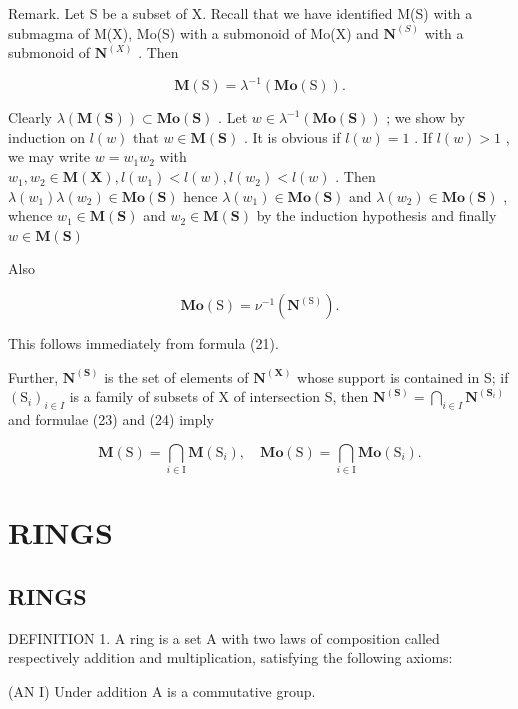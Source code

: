 Remark. Let S be a subset of X. Recall that we have identified M(S) with a submagma of M(X), Mo(S) with a submonoid of Mo(X) and \(\mathbf{N}^{(S)}\) with a submonoid of \(\mathbf{N}^{(X)}\) . Then

\[
\mathbf {M} (\mathrm{S}) = \lambda^ {- 1} (\mathbf {M o} (\mathrm{S})).\tag{23}
\]

Clearly \(\lambda (\mathbf{M}(\mathbf{S}))\subset \mathbf{Mo}(\mathbf{S})\) . Let \(w\in \lambda^{-1}(\mathbf{Mo}(\mathbf{S}))\) ; we show by induction on \(l(w)\) that \(w\in \mathbf{M}(\mathbf{S})\) . It is obvious if \(l(w) = 1\) . If \(l(w) > 1\) , we may write \(w = w_{1}w_{2}\) with \(w_{1},w_{2}\in \mathbf{M}(\mathbf{X}), l(w_{1}) <   l(w),l(w_{2}) <   l(w)\) . Then \(\lambda (w_1)\lambda (w_2)\in \mathbf{Mo}(\mathbf{S})\) hence \(\lambda (w_1)\in \mathbf{Mo}(\mathbf{S})\) and \(\lambda (w_2)\in \mathbf{Mo}(\mathbf{S})\) , whence \(w_{1}\in \mathbf{M}(\mathbf{S})\) and \(w_{2}\in \mathbf{M}(\mathbf{S})\) by the induction hypothesis and finally \(w\in \mathbf{M}(\mathbf{S})\)

Also

\[
\mathbf {M o} (\mathrm{S}) = \nu^ {- 1} (\mathbf {N} ^ {(\mathrm{S})}).\tag{24}
\]

This follows immediately from formula (21).

Further, \(\mathbf{N}^{(\mathbf{S})}\) is the set of elements of \(\mathbf{N}^{(\mathbf{X})}\) whose support is contained in S; if \((\mathrm{S}_i)_{i\in I}\) is a family of subsets of X of intersection S, then \(\mathbf{N}^{(\mathbf{S})} = \bigcap_{i\in I}\mathbf{N}^{(\mathbf{S}_i)}\) and formulae (23) and (24) imply

\[
\mathbf {M} (\mathrm{S}) = \bigcap_ {i \in \mathrm{I}} \mathbf {M} (\mathrm{S} _ {i}), \quad \mathbf {M o} (\mathrm{S}) = \bigcap_ {i \in \mathrm{I}} \mathbf {M o} (\mathrm{S} _ {i}).\tag{25}
\]

\section{RINGS}

\subsection{RINGS}

DEFINITION 1. A ring is a set A with two laws of composition called respectively addition and multiplication, satisfying the following axioms:

(AN I) Under addition A is a commutative group.

